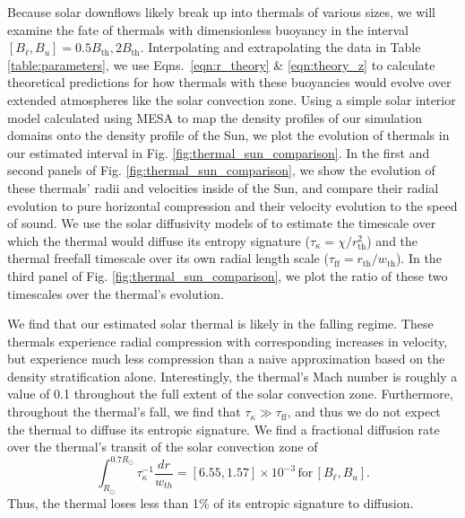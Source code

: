 Because solar downflows likely break up into thermals of various sizes, we will examine the fate of thermals with dimensionless buoyancy in the interval $[B_\ell, B_u] = 0.5B_\text{th}, 2B_\text{th}$.
Interpolating and extrapolating the data in Table \ref{table:parameters}, we use Eqns.~\ref{eqn:r_theory} \& \ref{eqn:theory_z} to calculate theoretical predictions for how thermals with these buoyancies would evolve over extended atmospheres like the solar convection zone.
Using a simple solar interior model calculated using MESA \cite{paxton&all2011} to map the density profiles of our simulation domains onto the density profile of the Sun, we plot the evolution of thermals in our estimated interval in Fig. \ref{fig:thermal_sun_comparison}.
In the first and second panels of Fig. \ref{fig:thermal_sun_comparison}, we show the evolution of these thermals' radii and velocities inside of the Sun, and compare their radial evolution to pure horizontal compression and their velocity evolution to the speed of sound.
We use the solar diffusivity models of \cite{brown2011} to estimate the timescale over which the thermal would diffuse its entropy signature ($\tau_\kappa = \chi/r_{\text{th}}^2$) and the thermal freefall timescale over its own radial length scale ($\tau_{\text{ff}} = r_{\text{th}}/w_{\text{th}}$).
In the third panel of Fig. \ref{fig:thermal_sun_comparison}, we plot the ratio of these two timescales over the thermal's evolution.

We find that our estimated solar thermal is likely in the falling regime.
These thermals experience radial compression with corresponding increases in velocity, but experience much less compression than a naive approximation based on the density stratification alone.
Interestingly, the thermal's Mach number is roughly a value of 0.1 throughout the full extent of the solar convection zone.
Furthermore, throughout the thermal's fall, we find that $\tau_\kappa \gg \tau_{\text{ff}}$, and thus we do not expect the thermal to diffuse its entropic signature.
We find a fractional diffusion rate over the thermal's transit of the solar convection zone of 
$$
\int_{R_\odot}^{0.7 R_\odot} \tau_\kappa^{-1} \frac{dr}{w_{th}} = [6.55, 1.57]\times 10^{-3}\,\text{for}\,[B_\ell, B_u].
$$
Thus, the thermal loses less than 1\% of its entropic signature to diffusion.

